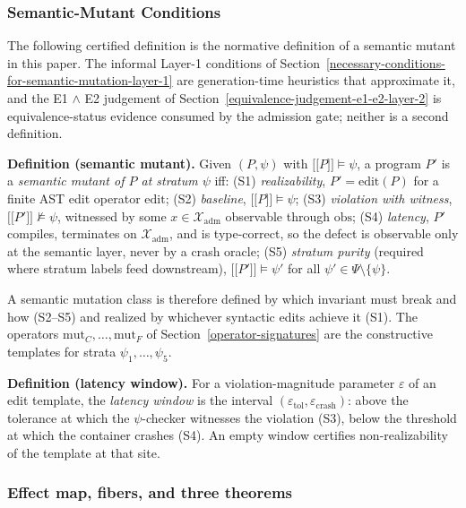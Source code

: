 \documentclass[manuscript,screen,review]{acmart}
\begin{document}
\subsubsection{Semantic-Mutant Conditions}\label{theory-s1s5}

The following certified definition is the normative definition of a
semantic mutant in this paper. The informal Layer-1 conditions of
Section~\ref{necessary-conditions-for-semantic-mutation-layer-1} are
generation-time heuristics that approximate it, and the E1 $\wedge$ E2
judgement of Section~\ref{equivalence-judgement-e1-e2-layer-2} is
equivalence-status evidence consumed by the admission gate; neither is a
second definition.

\textbf{Definition (semantic mutant).} Given $(P, \psi)$ with
$\mathopen{\lbrack\!\lbrack} P \mathclose{\rbrack\!\rbrack} \models \psi$, a program $P'$ is a
\emph{semantic mutant of $P$ at stratum $\psi$} iff: (S1)
\emph{realizability}, $P' = \mathrm{edit}(P)$ for a finite AST edit
operator $\mathrm{edit}$; (S2)
\emph{baseline}, $\mathopen{\lbrack\!\lbrack} P \mathclose{\rbrack\!\rbrack} \models \psi$; (S3)
\emph{violation with witness},
$\mathopen{\lbrack\!\lbrack} P' \mathclose{\rbrack\!\rbrack} \not\models \psi$, witnessed by some
$x \in \mathcal{X}_{\mathrm{adm}}$ observable through $\mathrm{obs}$; (S4)
\emph{latency}, $P'$ compiles, terminates on $\mathcal{X}_{\mathrm{adm}}$,
and is type-correct, so the defect is observable only at the semantic
layer, never by a crash oracle; (S5) \emph{stratum purity} (required
where stratum labels feed downstream),
$\mathopen{\lbrack\!\lbrack} P' \mathclose{\rbrack\!\rbrack} \models \psi'$ for all
$\psi' \in \Psi \setminus \{\psi\}$.

A semantic mutation class is therefore defined by which invariant must
break and how (S2--S5) and realized by whichever syntactic edits achieve
it (S1). The operators $\mathrm{mut}_C, \dots, \mathrm{mut}_F$ of Section~\ref{operator-signatures}
are the constructive templates for strata $\psi_1, \dots, \psi_5$.

\textbf{Definition (latency window).} For a violation-magnitude
parameter $\varepsilon$ of an edit template, the \emph{latency window}
is the interval $(\varepsilon_{\mathrm{tol}}, \varepsilon_{\mathrm{crash}})$:
above the tolerance at which the $\psi$-checker witnesses the violation
(S3), below the threshold at which the container crashes (S4). An empty
window certifies non-realizability of the template at that site.

\subsubsection{Effect map, fibers, and three theorems}\label{theory-fibers}
\end{document}
